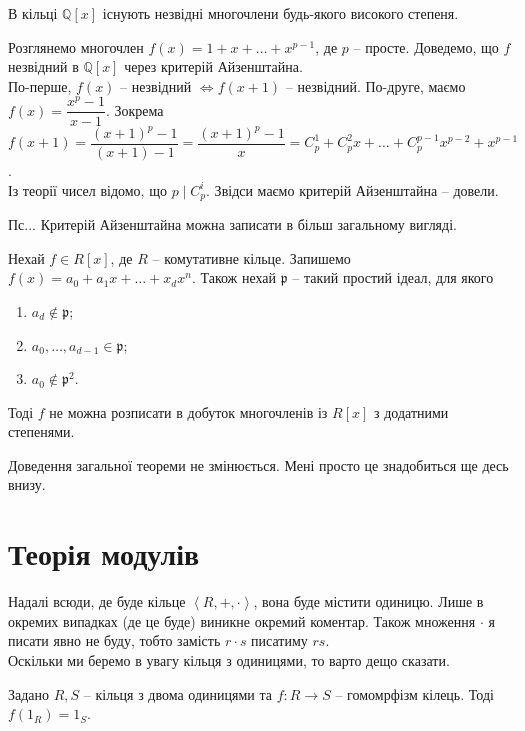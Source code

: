 \documentclass{math_library}
\begin{document}
\begin{corollary}
В кільці $\mathbb{Q}[x]$ існують незвідні многочлени будь-якого високого степеня.
\end{corollary}

\begin{example}
Розглянемо многочлен $f(x) = 1 + x + \dots + x^{p-1}$, де $p$ -- просте. Доведемо, що $f$ незвідний в $\mathbb{Q}[x]$ через критерій Айзенштайна.\\
По-перше, $f(x)$ -- незвідний $\iff f(x+1)$ -- незвідний. По-друге, маємо $f(x) = \dfrac{x^p-1}{x-1}$. Зокрема\\
$f(x+1) = \dfrac{(x+1)^p - 1}{(x+1)-1} = \dfrac{(x+1)^p - 1}{x} = C_p^1 + C_p^2 x + \dots + C_p^{p-1} x^{p-2} + x^{p-1}$.\\
Із теорії чисел відомо, що $p \mid C_p^{i}$. Звідси маємо критерій Айзенштайна -- довели. 
\end{example}

\begin{remark}
Пс... Критерій Айзенштайна можна записати в більш загальному вигляді.
\end{remark}

\begin{theorem}
Нехай $f \in R[x]$, де $R$ -- комутативне кільце. Запишемо $f(x) = a_0 + a_1 x + \dots + x_d x^n$. Також нехай $\mathfrak{p}$ -- такий простий ідеал, для якого
\begin{enumerate}[nosep,wide=0pt,label={\arabic*-}]
\item $a_d \notin \mathfrak{p}$;
\item $a_0,\dots,a_{d-1} \in \mathfrak{p}$;
\item $a_0 \notin \mathfrak{p}^2$.
\end{enumerate}
Тоді $f$ не можна розписати в добуток многочленів із $R[x]$ з додатними степенями.
\end{theorem}

Доведення загальної теореми не змінюється. Мені просто це знадобиться ще десь внизу.

\newpage

\iffalse
\section{Теорія модулів}
Надалі всюди, де буде кільце $\left< R,+,\cdot\right>$, вона буде містити одиницю. Лише в окремих випадках (де це буде) виникне окремий коментар. Також множення $\cdot$ я писати явно не буду, тобто замість $r \cdot s$ писатиму $rs$.
\bigskip \\
Оскільки ми беремо в увагу кільця з одиницями, то варто дещо сказати.
\begin{proposition}
Задано $R,S$ -- кільця з двома одиницями та $f \colon R \to S$ -- гомомрфізм кілець. Тоді $f(1_R) = 1_S$.
\end{proposition}
\end{document}
